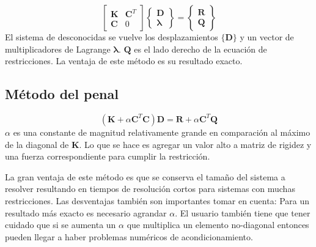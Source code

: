 \documentclass[11pt, a4paper,titlepage]{article}
\newcommand{\Cme}[1]{\boldsymbol{\{ }\mathbf{#1} \boldsymbol{\}} }
\newcommand{\CD}{\Cme{D}}
\begin{document}
\begin{equation}
	\begin{bmatrix}
	\mathbf{K} & \mathbf{C}^T\\
	\mathbf{C} & 0
	\end{bmatrix}
	\begin{Bmatrix}
	\mathbf{D} \\
	\pmb{\lambda}
	\end{Bmatrix}
	=
	\begin{Bmatrix}
	\mathbf{R} \\
	\mathbf{Q}
	\end{Bmatrix}
\end{equation}
El sistema de desconocidas se vuelve los desplazamientos $\CD$ y un vector de multiplicadores de Lagrange $\pmb{\lambda} $. $\mathbf{Q}$ es el lado derecho de la ecuación de restricciones. La ventaja de este método es su resultado exacto.

\subsection*{Método del penal}
\begin{equation}
	(\mathbf{K}+\alpha \mathbf{C}^T \mathbf{C})\mathbf{D} = \mathbf{R} + \alpha \mathbf{C}^T \mathbf{Q}
\end{equation}
$\alpha$ es una constante de magnitud relativamente grande en comparación al máximo de la diagonal de $\mathbf{K}$. Lo que se hace es agregar un valor alto a matriz de rigidez y una fuerza correspondiente para cumplir la restricción. 

La gran ventaja de este método es que se conserva el tamaño del sistema a resolver resultando en tiempos de resolución cortos para sistemas con muchas restricciones. Las desventajas también son importantes tomar en cuenta: Para un resultado más exacto es necesario agrandar $\alpha$. El usuario también tiene que tener cuidado que si se aumenta un $\alpha$ que multiplica un elemento no-diagonal entonces pueden llegar a haber problemas numéricos de acondicionamiento. 
\end{document}
